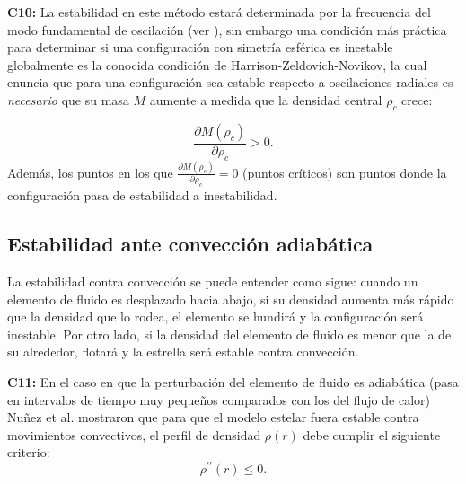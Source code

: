 \textbf{C10:} La estabilidad en este método estará determinada por la frecuencia del modo fundamental de oscilación (ver \cite{Haensel2007NeutronStructure,Shapiro1983}), sin embargo una condición más práctica para determinar si una configuraci\'on con simetría esférica es inestable globalmente es la conocida condición de Harrison-Zeldovich-Novikov, la cual enuncia que para una configuración sea estable respecto a oscilaciones radiales es \emph{necesario} que su masa $M$ aumente a medida que la densidad central $\rho_{c}$ crece: 

\begin{equation}
    \frac { \partial M \left( \rho _ { c } \right) } { \partial \rho _ { c } } > 0.
\end{equation}
Además, los puntos en los que $\frac { \partial M \left( \rho _ { c } \right) } { \partial \rho _ { c } } = 0$ (puntos críticos) son puntos donde la configuraci\'on pasa de estabilidad a inestabilidad.



\subsection*{Estabilidad ante convección adiabática}

La estabilidad contra convección se puede entender como sigue: cuando un elemento de fluido es desplazado hacia abajo, si su densidad aumenta más rápido que la densidad que lo rodea, el elemento se hundirá y la configuraci\'on será inestable. Por otro lado, si la densidad del elemento de fluido es menor que la de su alrededor, flotará y la estrella será estable contra convección.

\textbf{C11:} En el caso en que la perturbación del elemento de fluido es adiabática (pasa en intervalos de tiempo muy pequeños comparados con los del flujo de calor) Nuñez et al. \cite{Hernandez2018} mostraron que para que el modelo estelar fuera estable contra movimientos convectivos, el perfil de densidad $\rho(r)$ debe cumplir el siguiente criterio: 
\begin{equation}
    \rho ^ { \prime \prime } ( r ) \leq 0.
\end{equation}